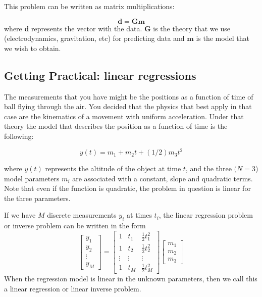 \documentclass{article}
\begin{document}
This problem can be written as matrix multiplications:


\begin{equation}
\mathbf{d} = \mathbf{G}\mathbf{m}
\end{equation}
where $\mathbf{d}$ represents the vector with the data. $\mathbf{G}$ is the theory that we use (electrodynamics, gravitation, etc) for predicting data and $\mathbf{m}$ is the model that we wish to obtain.


\subsection{Getting Practical: linear regressions}

The measurements that you have might be the positions as a function of time of ball flying through the air. You decided that the physics that best apply in that case are the kinematics of a movement with uniform acceleration. Under that theory the model that describes the position as a function of time is the following:

\begin{equation}
y(t) = m_1 + m_2 t + (1/2) m_3 t^2
\end{equation}

where $y(t)$ represents the altitude of the object at time $t$, and the three $(N=3$) model parameters $m_i$ are associated with a constant, slope and quadratic terms. Note that even if the function is quadratic, the problem in question is linear for the three parameters. 

If we have $M$ discrete measurements $y_i$ at times $t_i$, the linear regression problem or inverse problem can be written in the form
\begin{equation}
\left[
\begin{array}{c}
  y_1   \\
  y_2   \\
  \vdots \\
  y_M
\end{array}
\right] = 
\left[
\begin{array}{ccc}
  1 & t_1 & {\scriptstyle{\frac{1}{2}}}t_1^2 \\
  1  &t_2 &  {\scriptstyle{\frac{1}{2}}}t_2^2\\
  \vdots & \vdots  & \vdots\\
  1 & t_M &  {\scriptstyle{\frac{1}{2}}}t_M^2
\end{array}
\right]
\left[
\begin{array}{c}
  m_1   \\
  m_2    \\
  m_3
\end{array}
\right] 
\end{equation}
When the regression model is linear in the unknown parameters, then we call this a linear regression or linear inverse problem. 
\end{document}
